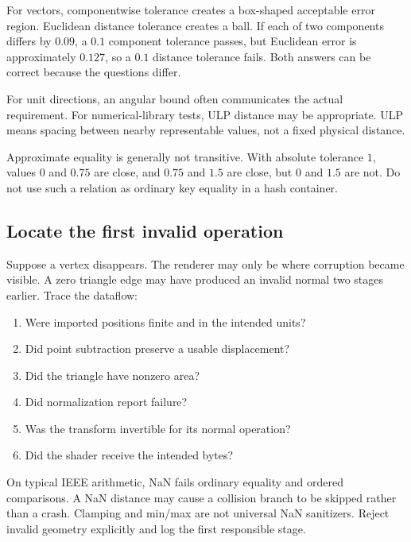 For vectors, componentwise tolerance creates a box-shaped acceptable error region. Euclidean distance tolerance creates a ball. If each of two components differs by \(0.09\), a \(0.1\) component tolerance passes, but Euclidean error is approximately \(0.127\), so a \(0.1\) distance tolerance fails. Both answers can be correct because the questions differ.

For unit directions, an angular bound often communicates the actual requirement. For numerical-library tests, ULP distance may be appropriate. ULP means spacing between nearby representable values, not a fixed physical distance.

Approximate equality is generally not transitive. With absolute tolerance \(1\), values \(0\) and \(0.75\) are close, and \(0.75\) and \(1.5\) are close, but \(0\) and \(1.5\) are not. Do not use such a relation as ordinary key equality in a hash container.

\subsection{Locate the first invalid operation}\label{02-foundations-ii-ch037-locate-the-first-invalid-operation}

Suppose a vertex disappears. The renderer may only be where corruption became visible. A zero triangle edge may have produced an invalid normal two stages earlier. Trace the dataflow:

\begin{enumerate}
\def\labelenumi{\arabic{enumi}.}
\tightlist
\item
  Were imported positions finite and in the intended units?
\item
  Did point subtraction preserve a usable displacement?
\item
  Did the triangle have nonzero area?
\item
  Did normalization report failure?
\item
  Was the transform invertible for its normal operation?
\item
  Did the shader receive the intended bytes?
\end{enumerate}

On typical IEEE arithmetic, NaN fails ordinary equality and ordered comparisons. A NaN distance may cause a collision branch to be skipped rather than a crash. Clamping and min/max are not universal NaN sanitizers. Reject invalid geometry explicitly and log the first responsible stage.

